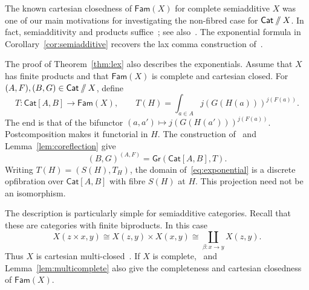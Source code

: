 \documentclass[11pt,a4paper]{amsart}
\theoremstyle{definition}
\numberwithin{equation}{section}
\newcommand{\Cat}{\mathsf{Cat}}
\newcommand{\Fam}{\mathsf{Fam}}
\newcommand{\Gr}{\mathsf{Gr}}
\newcommand{\sslash}{\mathbin{/\mkern-6mu/}}
\newcommand{\DX}{\Cat\sslash X}
\begin{document}
The known cartesian closedness of $\Fam(X)$ for complete semiadditive $X$ was one of our main motivations for investigating the non-fibred case for $\DX$. In fact, semiadditivity and products suffice~\cite[Proposition~74]{CHAD}; see also~\cite[Section~9]{NV}. The exponential formula in Corollary~\ref{cor:semiadditive} recovers the lax comma construction of~\cite[Section~9]{NV}.

The proof of Theorem~\ref{thm:lex} also describes the exponentials. Assume that $X$ has finite products and that $\Fam(X)$ is complete and cartesian closed. For $(A,F),(B,G)\in\DX$, define
\begin{equation}\label{eq:ends}
 T:\Cat[A,B]\longrightarrow\Fam(X),
 \qquad T(H)=\int_{a\in A}j(G(H(a)))^{j(F(a))}.
\end{equation}
The end is that of the bifunctor $(a,a')\mapsto j(G(H(a')))^{j(F(a))}$. Postcomposition makes it functorial in $H$. The construction of~\cite{CNP} and Lemma~\ref{lem:coreflection} give
\begin{equation}\label{eq:exponential}
 (B,G)^{(A,F)}=\Gr(\Cat[A,B],T).
\end{equation}
Writing $T(H)=(S(H),T_H)$, the domain of~\eqref{eq:exponential} is a discrete opfibration over $\Cat[A,B]$ with fibre $S(H)$ at $H$. This projection need not be an isomorphism.

The description is particularly simple for semiadditive categories. Recall that these are categories with finite biproducts. In this case
\begin{equation}\label{eq:biproduct}
 X(z\times x,y)\cong X(z,y)\times X(x,y)
 \cong\coprod_{\beta:x\to y}X(z,y).
\end{equation}
Thus $X$ is cartesian multi-closed~\cite[Example~2.9(b)]{AR}. If $X$ is complete,~\cite[Theorem~2.11]{AR} and Lemma~\ref{lem:multicomplete} also give the completeness and cartesian closedness of $\Fam(X)$.
\end{document}
